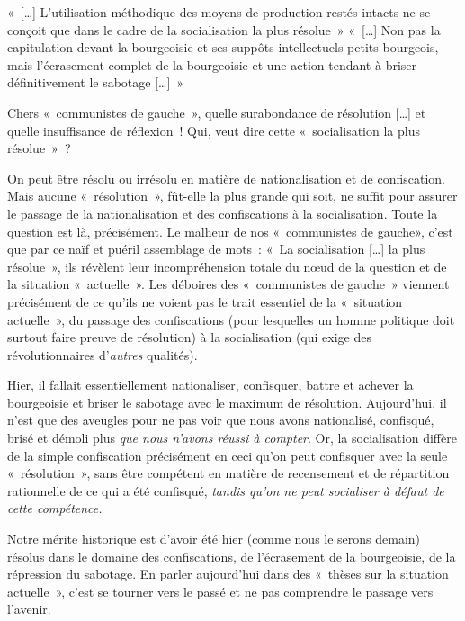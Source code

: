 \documentclass[french,twoside]{book} %
\newenvironment{quoteblock}%
  {\begin{quoting}}
  {\end{quoting}}
\newenvironment{quotebar}{%
    \def\FrameCommand{{\color{rubric!10!}\vrule width 0.5em} \hspace{0.9em}}%
    \def\OuterFrameSep{\itemsep} %
    \MakeFramed {\advance\hsize-\width \FrameRestore}
  }%
  {%
    \endMakeFramed
  }
\renewenvironment{quoteblock}%
  {%
    \savenotes
    \setstretch{0.9}
    \normalfont
    \begin{quotebar}
  }
  {%
    \end{quotebar}
    \spewnotes
  }
\begin{document}
\begin{quoteblock}
 \noindent « […] L'utilisation méthodique des moyens de production restés intacts ne se conçoit que dans le cadre de la socialisation la plus résolue » « […] Non pas la capitulation devant la bourgeoisie et ses suppôts intellectuels petits‑bourgeois, mais l’écrasement complet de la bourgeoisie et une action tendant à briser définitivement le sabotage […] »
\end{quoteblock}

\noindent Chers « communistes de gauche », quelle surabondance de résolution […] et quelle insuffisance de réflexion ! Qui, veut dire cette « socialisation la plus résolue » ?\par
On peut être résolu ou irrésolu en matière de nationalisation et de confiscation. Mais aucune \hspace{1em}« résolution », fût-elle la plus grande qui soit, ne suffit pour assurer le passage de la nationalisation et des confiscations à la socialisation. Toute la question est là, précisément. Le malheur de nos \hspace{1em}« communistes de gauche», c’est que par ce naïf et puéril assemblage de mots : « La socialisation […] la plus résolue », ils révèlent leur incompréhension totale du nœud de la question et de la situation \hspace{1em}« actuelle ». Les déboires des « communistes de gauche » viennent précisément de ce qu’ils ne voient pas le trait essentiel de la « situation actuelle », du passage des confiscations (pour lesquelles un homme politique doit surtout faire preuve de résolution) à la socialisation (qui exige des révolutionnaires d’\emph{autres} qualités).\par
Hier, il fallait essentiellement nationaliser, confisquer, battre et achever la bourgeoisie et briser le sabotage avec le maximum de résolution. Aujourd’hui, il n’est que des aveugles pour ne pas voir que nous avons nationalisé, confisqué, brisé et démoli plus \emph{que nous n’avons réussi à compter}. Or, la socialisation diffère de la simple confiscation précisément en ceci qu’on peut confisquer avec la seule « résolution », sans être compétent en matière de recensement et de répartition rationnelle de ce qui a été confisqué, \emph{tandis qu’on ne peut socialiser à défaut de cette compétence.}\par
Notre mérite historique est d’avoir été hier (comme nous le serons demain) résolus dans le domaine des confiscations, de l’écrasement de la bourgeoisie, de la répression du sabotage. En parler aujourd’hui dans des « thèses sur la situation actuelle », c’est se tourner vers le passé et ne pas comprendre le passage vers l’avenir.\par
\end{document}
